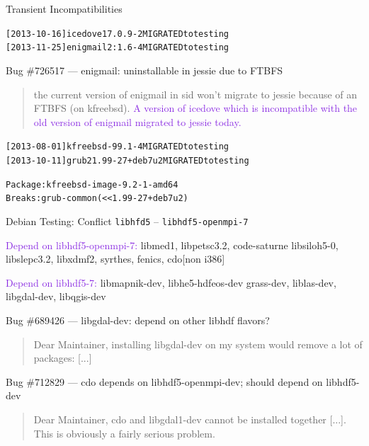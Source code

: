 \documentclass[xcolor={dvipsnames}]{beamer}
\newcommand{\EEE}[1]{\textcolor{BlueViolet}{#1}}
\begin{document}
\begin{frame}[fragile]{Transient Incompatibilities}

\begin{alltt}
[2013-10-16] icedove 17.0.9-2 MIGRATED to testing
[2013-11-25] enigmail 2:1.6-4 MIGRATED to testing
\end{alltt}

Bug \#726517 ---  enigmail: uninstallable in jessie due to FTBFS
\begin{quote}
the current version of enigmail in sid won’t migrate to jessie
because of an FTBFS (on kfreebsd). \EEE{A version of icedove which
is incompatible with the old version of enigmail migrated to
jessie today.}
\end{quote}

\vspace{0.5em}

\begin{alltt}
[2013-08-01] kfreebsd-9 9.1-4 MIGRATED to testing
[2013-10-11] grub2 1.99-27+deb7u2 MIGRATED to testing
\end{alltt}

\begin{alltt}
Package: kfreebsd-image-9.2-1-amd64
Breaks: grub-common (<< 1.99-27+deb7u2)
\end{alltt}

\end{frame}

\begin{frame}{Debian Testing: Conflict \texttt{libhfd5} -- \texttt{libhdf5-openmpi-7}}

\EEE{Depend on libhdf5-openmpi-7:} libmed1, libpetsc3.2, code-saturne
libsiloh5-0, libslepc3.2, libxdmf2, syrthes, fenics, cdo[non i386]

\vspace{0.5em}

\EEE{Depend on libhdf5-7:} libmapnik-dev, libhe5-hdfeos-dev
grass-dev, liblas-dev, libgdal-dev, libqgis-dev

\vspace{2em}

Bug \#689426 --- libgdal-dev: depend on other libhdf flavors?
\begin{quote}
Dear Maintainer, 
installing libgdal-dev on my system would remove a lot of packages: [...]
\end{quote}
Bug \#712829 --- cdo depends on libhdf5-openmpi-dev; should depend on libhdf5-dev
\begin{quote}
Dear Maintainer,
cdo and libgdal1-dev cannot be installed together [...].
This is obviously a fairly serious
problem.
\end{quote}

\end{frame}
\end{document}
